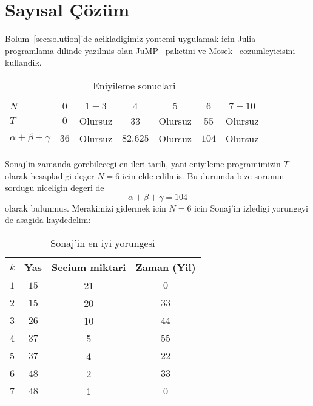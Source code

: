 \section{Say{\i}sal \c{C}\"{o}z\"{u}m}
\label{sec:numerical}

Bolum~\ref{sec:solution}'de acikladigimiz yontemi uygulamak icin
Julia~\citep{bezanson2017julia} programlama dilinde yazilmis olan
JuMP~\citep{DunningHuchetteLubin2017} paketini ve Mosek~\citep{mosek}
cozumleyicisini kullandik.

\begin{table}[h]
\caption{Eniyileme sonuclari}
\label{tab:optimization_results}
\centering
\begin{tabular}{l|cccccc}
   $N$ & $0$ & $1-3$ & $4$ & $5$ & $6$ & $7-10$ \\ \hline
   $T$ & $0$ & Olursuz & 33 & Olursuz & 55 & Olursuz \\
   $\alpha + \beta + \gamma$ & $36$ & Olursuz & $82.625$ & Olursuz & $104$ & Olursuz 
\end{tabular}
\end{table}

Sonaj'in zamanda gorebilecegi en ileri tarih, yani eniyileme programimizin $T$
olarak hesapladigi deger $N=6$ icin elde edilmis. Bu durumda bize sorunun
sordugu niceligin degeri de \[ \alpha + \beta + \gamma = 104 \] olarak bulunmus.
Merakimizi gidermek icin $N=6$ icin Sonaj'in izledigi yorungeyi de asagida
kaydedelim:

\begin{table}[h]
    \caption{Sonaj'in en iyi yorungesi}
    \label{tab:trajectory}
    \centering
    \begin{tabular}{l|ccc}
       $k$ & Yas & Secium miktari & Zaman (Yil) \\ \hline
       $1$ & $15$ & 21 & $0$ \\
       $2$ & $15$ & 20 & $33$ \\
       $3$ & $26$ & 10 & $44$ \\
       $4$ & $37$ & 5 & $55$ \\
       $5$ & $37$ & 4 & $22$ \\
       $6$ & $48$ & 2 & $33$ \\
       $7$ & $48$ & 1 & $0$
    \end{tabular}
\end{table}